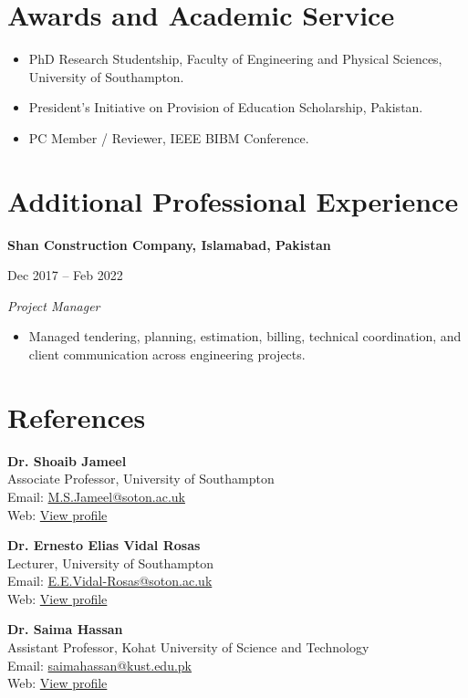 \documentclass[11pt,a4paper]{article}
\newcommand{\entry}[4]{
  \textbf{#1}\par
  {\small\color{cvmuted}#2}\par
  \emph{#3}%
  \if\relax\detokenize{#4}\relax\else\hfill{\small\color{cvmuted}\emph{#4}}\fi\par
  \vspace{0.08em}
}
\newcommand{\refblock}[4]{
  \textbf{#1}\\
  {\small #2}\\
  {\small Email: \href{mailto:#3}{#3}}\\
  {\small Web: \href{#4}{View profile}}
}
\begin{document}
\section*{Awards and Academic Service}
\begin{itemize}
  \item PhD Research Studentship, Faculty of Engineering and Physical Sciences, University of Southampton.
  \item President's Initiative on Provision of Education Scholarship, Pakistan.
  \item PC Member / Reviewer, IEEE BIBM Conference.
\end{itemize}

\section*{Additional Professional Experience}
\entry{Shan Construction Company, Islamabad, Pakistan}{Dec 2017 -- Feb 2022}{Project Manager}{}
\begin{itemize}
  \item Managed tendering, planning, estimation, billing, technical coordination, and client communication across engineering projects.
\end{itemize}

\section*{References}
\noindent
\begin{minipage}[t]{0.47\linewidth}
\refblock
{Dr. Shoaib Jameel}
{Associate Professor, University of Southampton}
{M.S.Jameel@soton.ac.uk}
{https://bashthebuilder.github.io/}
\end{minipage}\hfill
\begin{minipage}[t]{0.47\linewidth}
\refblock
{Dr. Ernesto Elias Vidal Rosas}
{Lecturer, University of Southampton}
{E.E.Vidal-Rosas@soton.ac.uk}
{https://www.southampton.ac.uk/people/62tttx/doctor-ernesto-elias-vidal-rosas#about}
\end{minipage}

\vspace{0.45em}
\noindent
\begin{minipage}[t]{0.47\linewidth}
\refblock
{Dr. Saima Hassan}
{Assistant Professor, Kohat University of Science and Technology}
{saimahassan@kust.edu.pk}
{https://www.linkedin.com/in/drsaima-hassan/?originalSubdomain=pk}
\end{minipage}
\end{document}
